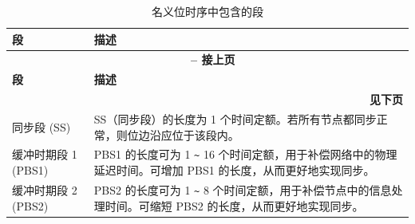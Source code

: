 \begin{longtable}[c]{|p{2.5cm}|p{13cm}|}

  \caption{名义位时序中包含的段}
  \label{tab:twai-seg-of-a-nominal-bit-time}
  \\\hline
  \rowcolor{lightgray}
  \textbf{段} & \textbf{描述}
  \\\hline
  \endfirsthead

  \multicolumn{2}{c}{\bfseries \tablename\ \thetable{} -- 接上页}\\  \hline

  \rowcolor{lightgray}
    \textbf{段} & \textbf{描述}
  \\\hline
  \endhead

  \multicolumn{2}{r}{\textbf{见下页}} \\
  \endfoot
  \endlastfoot

    同步段 (SS) & SS（同步段）的长度为 1 个时间定额。若所有节点都同步正常，则位边沿应位于该段内。
            \\\hline
    缓冲时期段 1 (PBS1) & PBS1 的长度可为 1 \verb+~+ 16 个时间定额，用于补偿网络中的物理延迟时间。可增加 PBS1 的长度，从而更好地实现同步。
            \\\hline
    缓冲时期段 2 (PBS2) & PBS2 的长度可为 1 \verb+~+ 8 个时间定额，用于补偿节点中的信息处理时间。可缩短 PBS2 的长度，从而更好地实现同步。
            \\\hline

\end{longtable}